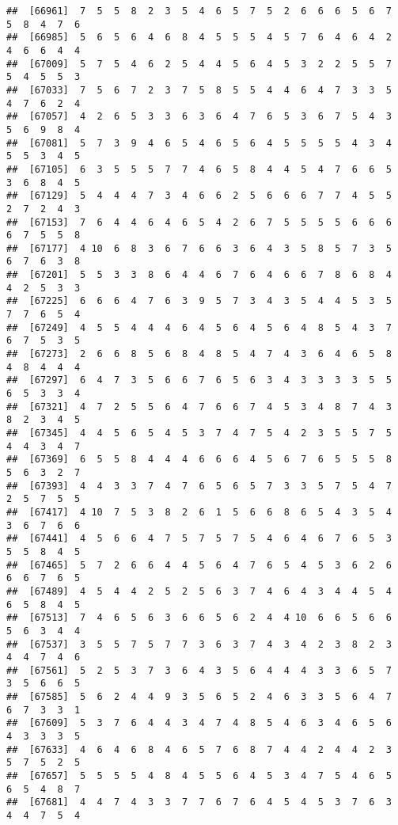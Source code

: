 \documentclass[
]{book}
\begin{document}
\begin{verbatim}
##  [66961]  7  5  5  8  2  3  5  4  6  5  7  5  2  6  6  6  5  6  7  5  8  4  7  6
##  [66985]  5  6  5  6  4  6  8  4  5  5  5  4  5  7  6  4  6  4  2  4  6  6  4  4
##  [67009]  5  7  5  4  6  2  5  4  4  5  6  4  5  3  2  2  5  5  7  5  4  5  5  3
##  [67033]  7  5  6  7  2  3  7  5  8  5  5  4  4  6  4  7  3  3  5  4  7  6  2  4
##  [67057]  4  2  6  5  3  3  6  3  6  4  7  6  5  3  6  7  5  4  3  5  6  9  8  4
##  [67081]  5  7  3  9  4  6  5  4  6  5  6  4  5  5  5  5  4  3  4  5  5  3  4  5
##  [67105]  6  3  5  5  5  7  7  4  6  5  8  4  4  5  4  7  6  6  5  3  6  8  4  5
##  [67129]  5  4  4  4  7  3  4  6  6  2  5  6  6  6  7  7  4  5  5  2  7  2  4  3
##  [67153]  7  6  4  4  6  4  6  5  4  2  6  7  5  5  5  5  6  6  6  6  7  5  5  8
##  [67177]  4 10  6  8  3  6  7  6  6  3  6  4  3  5  8  5  7  3  5  6  7  6  3  8
##  [67201]  5  5  3  3  8  6  4  4  6  7  6  4  6  6  7  8  6  8  4  4  2  5  3  3
##  [67225]  6  6  6  4  7  6  3  9  5  7  3  4  3  5  4  4  5  3  5  7  7  6  5  4
##  [67249]  4  5  5  4  4  4  6  4  5  6  4  5  6  4  8  5  4  3  7  6  7  5  3  5
##  [67273]  2  6  6  8  5  6  8  4  8  5  4  7  4  3  6  4  6  5  8  4  8  4  4  4
##  [67297]  6  4  7  3  5  6  6  7  6  5  6  3  4  3  3  3  3  5  5  6  5  3  3  4
##  [67321]  4  7  2  5  5  6  4  7  6  6  7  4  5  3  4  8  7  4  3  8  2  3  4  5
##  [67345]  4  4  5  6  5  4  5  3  7  4  7  5  4  2  3  5  5  7  5  4  4  3  4  7
##  [67369]  6  5  5  8  4  4  4  6  6  6  4  5  6  7  6  5  5  5  8  5  6  3  2  7
##  [67393]  4  4  3  3  7  4  7  6  5  6  5  7  3  3  5  7  5  4  7  2  5  7  5  5
##  [67417]  4 10  7  5  3  8  2  6  1  5  6  6  8  6  5  4  3  5  4  3  6  7  6  6
##  [67441]  4  5  6  6  4  7  5  7  5  7  5  4  6  4  6  7  6  5  3  5  5  8  4  5
##  [67465]  5  7  2  6  6  4  4  5  6  4  7  6  5  4  5  3  6  2  6  6  6  7  6  5
##  [67489]  4  5  4  4  2  5  2  5  6  3  7  4  6  4  3  4  4  5  4  6  5  8  4  5
##  [67513]  7  4  6  5  6  3  6  6  5  6  2  4  4 10  6  6  5  6  6  5  6  3  4  4
##  [67537]  3  5  5  7  5  7  7  3  6  3  7  4  3  4  2  3  8  2  3  4  4  7  4  6
##  [67561]  5  2  5  3  7  3  6  4  3  5  6  4  4  4  3  3  6  5  7  3  5  6  6  5
##  [67585]  5  6  2  4  4  9  3  5  6  5  2  4  6  3  3  5  6  4  7  6  7  3  3  1
##  [67609]  5  3  7  6  4  4  3  4  7  4  8  5  4  6  3  4  6  5  6  4  3  3  3  5
##  [67633]  4  6  4  6  8  4  6  5  7  6  8  7  4  4  2  4  4  2  3  5  7  5  2  5
##  [67657]  5  5  5  5  4  8  4  5  5  6  4  5  3  4  7  5  4  6  5  6  5  4  8  7
##  [67681]  4  4  7  4  3  3  7  7  6  7  6  4  5  4  5  3  7  6  3  4  4  7  5  4

\end{verbatim}
\end{document}
